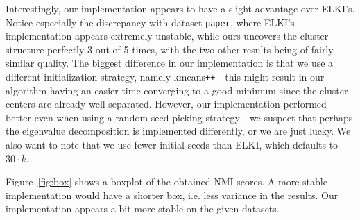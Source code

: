 \documentclass[english]{scrartcl}
\begin{document}
Interestingly, our implementation appears to have a slight advantage over
ELKI's.  Notice especially the discrepancy with dataset \texttt{paper}, where
ELKI's implementation appears extremely unstable, while ours uncovers the
cluster structure perfectly 3 out of 5 times, with the two other results being of fairly similar quality. The biggest difference in our
implementation is that we use a different initialization strategy, namely
kmeans\texttt{++}---this might result in our algorithm having an easier time
converging to a good minimum since the cluster centers are already
well-separated. However, our implementation performed better even when using a
random seed picking strategy---we suspect that perhaps the eigenvalue
decomposition is implemented differently, or we are just lucky. We also want to
note that we use fewer initial seeds than ELKI, which defaults to $30 \cdot k$.

Figure~\ref{fig:box} shows a boxplot of the obtained NMI scores. A more stable implementation
would have a shorter box, i.e. less variance in the results. Our implementation appears
a bit more stable on the given datasets.
\end{document}
